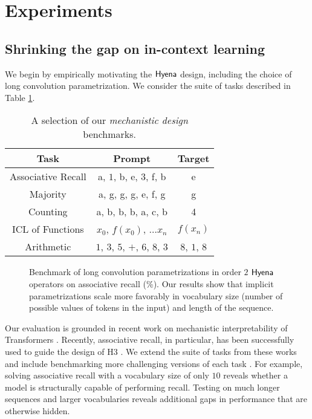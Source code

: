 \section{Experiments}\label{experiments}
%
\subsection{Shrinking the gap on in-context learning}\label{eval_ker}
%
We begin by empirically motivating the ${\sf Hyena}$ design, including the choice of long convolution parametrization. We consider the suite of tasks described in Table \ref{table:grok}.
%
\begin{table}[b]
    \small
    \centering
    \caption{A selection of our \textit{mechanistic design} benchmarks.}
    \setlength{\tabcolsep}{5.8pt}
    \label{table:grok}
    \begin{tabular}{@{}c|cc@{}}
    \toprule
    \textbf{Task} &\multicolumn{1}{c}{\textbf{Prompt}}&\multicolumn{1}{c}{\textbf{Target}}\\
    \midrule 
    Associative Recall & a, $1$, b, e, $3$, f, b & e\\  
    Majority & a, g, g, g, e, f, g & g \\
    Counting & a, b, b, b, a, c, b & 4\\
    ICL of Functions & $x_0$, $f(x_0)$, $\dots x_n$ & $f(x_n)$ \\ 
    Arithmetic & $1$, $3$, $5$, $+$, $6$, $8$, $3$ & $8$, $1$, $8$ \\
    \bottomrule
    \end{tabular}
\end{table}
%
\begin{figure*}[t]
  \centering
  
  \caption{Benchmark of long convolution parametrizations in order $2$ ${\sf Hyena}$ operators on associative recall (\%). Our results show that implicit parametrizations scale more favorably in vocabulary size (number of possible values of tokens in the input) and length of the sequence.}
  \label{fig:synthetics1}
\end{figure*}
%
Our evaluation is grounded in recent work on mechanistic interpretability of Transformers \citep{elhage2021mathematical,power2022grokking,olsson2022context,zhang2022unveiling}. Recently, associative recall, in particular, has been successfully used to guide the design of H3 \citep{dao2022hungry}. We extend the suite of tasks from these works and include benchmarking more challenging versions of each task . For example, solving associative recall with a vocabulary size of only $10$ reveals whether a model is structurally capable of performing recall. Testing on much longer sequences and larger vocabularies reveals additional gaps in performance that are otherwise hidden.
%
